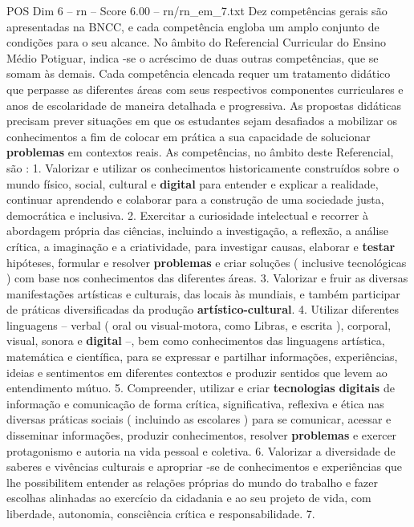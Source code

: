 \begin{textsample}{POS Dim 6 – rn – Score 6.00 – rn/rn\_em\_7.txt}
Dez competências gerais são apresentadas na BNCC, e cada competência engloba um amplo conjunto de condições para o seu alcance.
No âmbito do Referencial Curricular do Ensino Médio Potiguar, indica -se o acréscimo de duas outras competências, que se somam às demais.
Cada competência elencada requer um tratamento didático que perpasse as diferentes áreas com seus respectivos componentes curriculares e anos de escolaridade de maneira detalhada e progressiva.
As propostas didáticas precisam prever situações em que os estudantes sejam desafiados a mobilizar os conhecimentos a fim de colocar em prática a sua capacidade de solucionar \textbf{problemas} em contextos reais.
As competências, no âmbito deste Referencial, são : 1.
Valorizar e utilizar os conhecimentos historicamente construídos sobre o mundo físico, social, cultural e \textbf{digital} para entender e explicar a realidade, continuar aprendendo e colaborar para a construção de uma sociedade justa, democrática e inclusiva. 2.
Exercitar a curiosidade intelectual e recorrer à abordagem própria das ciências, incluindo a investigação, a reflexão, a análise crítica, a imaginação e a criatividade, para investigar causas, elaborar e \textbf{testar} hipóteses, formular e resolver \textbf{problemas} e criar soluções ( inclusive tecnológicas ) com base nos conhecimentos das diferentes áreas. 3.
Valorizar e fruir as diversas manifestações artísticas e culturais, das locais às mundiais, e também participar de práticas diversificadas da produção \textbf{artístico-cultural}. 4.
Utilizar diferentes linguagens – verbal ( oral ou visual-motora, como Libras, e escrita ), corporal, visual, sonora e \textbf{digital} –, bem como conhecimentos das linguagens artística, matemática e científica, para se expressar e partilhar informações, experiências, ideias e sentimentos em diferentes contextos e produzir sentidos que levem ao entendimento mútuo. 5.
Compreender, utilizar e criar \textbf{tecnologias} \textbf{digitais} de informação e comunicação de forma crítica, significativa, reflexiva e ética nas diversas práticas sociais ( incluindo as escolares ) para se comunicar, acessar e disseminar informações, produzir conhecimentos, resolver \textbf{problemas} e exercer protagonismo e autoria na vida pessoal e coletiva. 6.
Valorizar a diversidade de saberes e vivências culturais e apropriar -se de conhecimentos e experiências que lhe possibilitem entender as relações próprias do mundo do trabalho e fazer escolhas alinhadas ao exercício da cidadania e ao seu projeto de vida, com liberdade, autonomia, consciência crítica e responsabilidade. 7.

\end{textsample}
